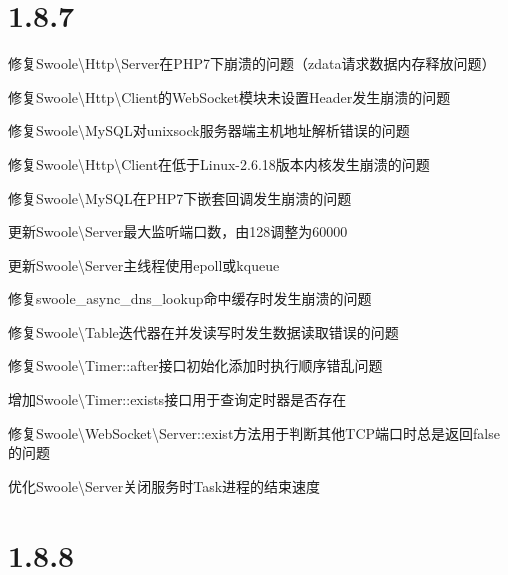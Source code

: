 \section{1.8.7}


\begin{compactitem}
\item 修复Swoole\textbackslash Http\textbackslash Server在PHP7下崩溃的问题（zdata请求数据内存释放问题）
\item 修复Swoole\textbackslash Http\textbackslash Client的WebSocket模块未设置Header发生崩溃的问题
\item 修复Swoole\textbackslash MySQL对unixsock服务器端主机地址解析错误的问题
\item 修复Swoole\textbackslash Http\textbackslash Client在低于Linux-2.6.18版本内核发生崩溃的问题
\item 修复Swoole\textbackslash MySQL在PHP7下嵌套回调发生崩溃的问题
\item 更新Swoole\textbackslash Server最大监听端口数，由128调整为60000
\item 更新Swoole\textbackslash Server主线程使用epoll或kqueue
\item 修复swoole\_async\_dns\_lookup命中缓存时发生崩溃的问题
\item 修复Swoole\textbackslash Table迭代器在并发读写时发生数据读取错误的问题
\item 修复Swoole\textbackslash Timer::after接口初始化添加时执行顺序错乱问题
\item 增加Swoole\textbackslash Timer::exists接口用于查询定时器是否存在
\item 修复Swoole\textbackslash WebSocket\textbackslash Server::exist方法用于判断其他TCP端口时总是返回false的问题
\item 优化Swoole\textbackslash Server关闭服务时Task进程的结束速度
\end{compactitem}



\section{1.8.8}


